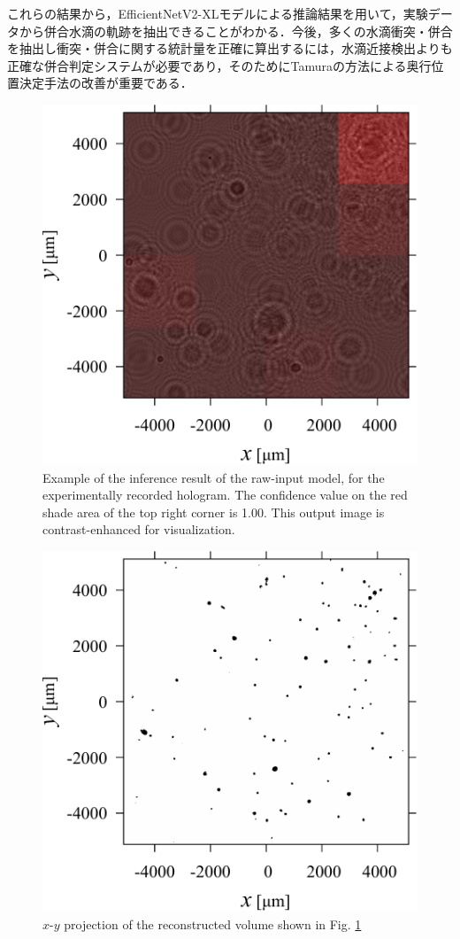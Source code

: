 これらの結果から，EfficientNetV2-XLモデルによる推論結果を用いて，実験データから併合水滴の軌跡を抽出できることがわかる．今後，多くの水滴衝突・併合を抽出し衝突・併合に関する統計量を正確に算出するには，水滴近接検出よりも正確な併合判定システムが必要であり，そのためにTamuraの方法による奥行位置決定手法の改善が重要である．




\begin{figure}[H]
    \centering
    \includegraphics[width=0.8\linewidth]{./Figure/4_Results/exp/visout.pdf}
    \caption{Example of the inference result of the raw-input model, for the experimentally recorded hologram. The confidence value on the red shade area of the top right corner is \num{1.00}. This output image is contrast-enhanced for visualization.}
    \label{fig:expInfResult}
\end{figure}

\begin{figure}[H]
    \centering
    \includegraphics[width=0.8\linewidth]{./Figure/4_Results/exp/imp.pdf}
    \caption{$x$-$y$ projection of the reconstructed volume shown in Fig. \ref{fig:expInfResult}}
    \label{fig:expHoloImp}
\end{figure}

